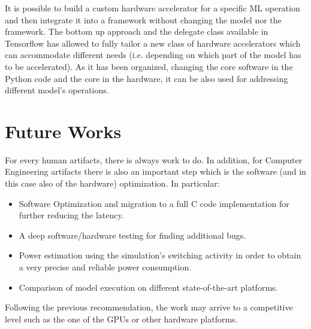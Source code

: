 It is possible to build a custom hardware accelerator for a specific ML operation and then integrate it into a framework without changing the model nor the framework.
The bottom up approach and the delegate class available in Tensorflow has allowed to fully tailor a new class of hardware accelerators which can accommodate different needs (i.e. depending on which part of the model has to be accelerated). As it has been organized, changing the core software in the Python code and the core in the hardware, it can be also used for addressing different model's operations.

\section{Future Works}
For every human artifacts, there is always work to do. In addition, for Computer Engineering artifacts there is also an important step which is the software (and in this case also of the hardware) optimization.
In particular:\\
\begin{itemize}
\item Software Optimization and migration to a full C code implementation for further reducing the latency.
\item A deep software/hardware testing for finding additional bugs.
\item Power estimation using the simulation’s switching activity in order to obtain a very precise and reliable power consumption.
\item Comparison of model execution on different state-of-the-art platforms.\\
\end{itemize}

Following the previous recommendation, the work may arrive to a competitive level such as the one of the GPUs or other hardware platforms.
